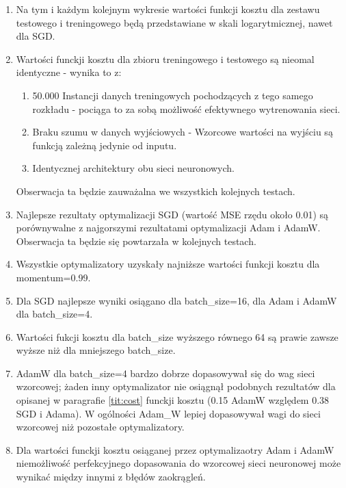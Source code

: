 \documentclass[12pt]{article}
\begin{document}
\begin{enumerate}
	\item Na tym i każdym kolejnym wykresie wartości funkcji kosztu dla zestawu testowego i treningowego będą przedstawiane w skali logarytmicznej, nawet dla SGD.
	\item Wartości funckji kosztu dla zbioru treningowego i testowego są nieomal identyczne - wynika to z:
	\begin{enumerate}
		\item 50.000 Instancji danych treningowych pochodzących z tego samego rozkładu - pociąga to za sobą możliwość efektywnego wytrenowania sieci.
		\item Braku szumu w danych wyjściowych - Wzorcowe wartości na wyjściu są funkcją zależną jedynie od inputu.
		\item Identycznej architektury obu sieci neuronowych.
	\end{enumerate}
	Obserwacja ta będzie zauważalna we wszystkich kolejnych testach.
	\item Najlepsze rezultaty optymalizacji SGD (wartość MSE rzędu około 0.01) są porównywalne z najgorszymi rezultatami optymalizacji Adam i AdamW. Obserwacja ta będzie się powtarzała w kolejnych testach.
	\item Wszystkie optymalizatory uzyskały najniższe wartości funkcji kosztu dla momentum=0.99.
	\item Dla SGD najlepsze wyniki osiągano dla batch\_size=16, dla Adam i AdamW dla batch\_size=4.
	\item Wartości fukcji kosztu dla batch\_size wyższego równego 64 są prawie zawsze wyższe niż dla mniejszego batch\_size.
	\item AdamW dla batch\_size=4 bardzo dobrze dopasowywał się do wag sieci wzorcowej; żaden inny optymalizator nie osiągnął podobnych rezultatów dla opisanej w paragrafie \ref{tit:cost} funckji kosztu (0.15 AdamW względem 0.38 SGD i Adama). W ogólności Adam\_W lepiej dopasowywał wagi do sieci wzorcowej niż pozostałe optymalizatory.
	\item Dla wartości funckji kosztu osiąganej przez optymalizaotry Adam i AdamW niemożliwość perfekcyjnego dopasowania do wzorcowej sieci neuronowej może wynikać między innymi z błędów zaokrągleń.
\end{enumerate}
\end{document}
